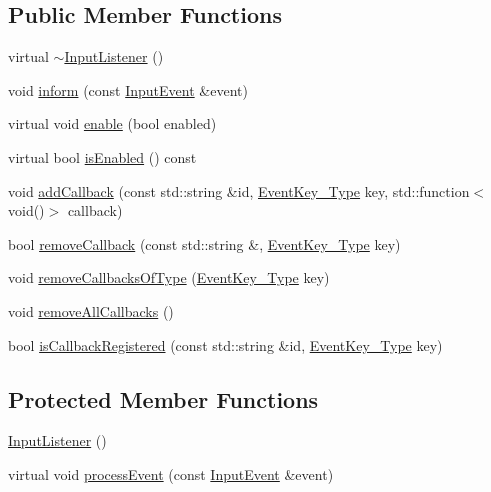 \subsection*{Public Member Functions}
\begin{DoxyCompactItemize}
\item 
virtual \mbox{\hyperlink{classec_1_1_input_listener_afd65ca201e735f5758646d6653f42804}{$\sim$\+Input\+Listener}} ()
\item 
void \mbox{\hyperlink{classec_1_1_input_listener_a39e0803651e945e177336df2cf84d61b}{inform}} (const \mbox{\hyperlink{structec_1_1_input_event}{Input\+Event}} \&event)
\item 
virtual void \mbox{\hyperlink{classec_1_1_input_listener_a459a44443e7de70e854c2175b6c6914d}{enable}} (bool enabled)
\item 
virtual bool \mbox{\hyperlink{classec_1_1_input_listener_a6d7a4e04543e3a86745261d9fefcbfc1}{is\+Enabled}} () const
\item 
void \mbox{\hyperlink{classec_1_1_input_listener_a9d43ca3fbda2db5809b29d7f237d41c4}{add\+Callback}} (const std\+::string \&id, \mbox{\hyperlink{classec_1_1_input_listener_af5dfb691564fa8e05fcf7f053e3c532b}{Event\+Key\+\_\+\+Type}} key, std\+::function$<$ void()$>$ callback)
\item 
bool \mbox{\hyperlink{classec_1_1_input_listener_a1f341d07bdf9c98392cd47c177c73de2}{remove\+Callback}} (const std\+::string \&, \mbox{\hyperlink{classec_1_1_input_listener_af5dfb691564fa8e05fcf7f053e3c532b}{Event\+Key\+\_\+\+Type}} key)
\item 
void \mbox{\hyperlink{classec_1_1_input_listener_a66e75fbfd13ec7cf87be9bebf2e02be8}{remove\+Callbacks\+Of\+Type}} (\mbox{\hyperlink{classec_1_1_input_listener_af5dfb691564fa8e05fcf7f053e3c532b}{Event\+Key\+\_\+\+Type}} key)
\item 
void \mbox{\hyperlink{classec_1_1_input_listener_ab3c4085477da60677e0a0659f750ead4}{remove\+All\+Callbacks}} ()
\item 
bool \mbox{\hyperlink{classec_1_1_input_listener_a7904bb2c23ef7dc00e341b8b3c9d1afb}{is\+Callback\+Registered}} (const std\+::string \&id, \mbox{\hyperlink{classec_1_1_input_listener_af5dfb691564fa8e05fcf7f053e3c532b}{Event\+Key\+\_\+\+Type}} key)
\end{DoxyCompactItemize}
\subsection*{Protected Member Functions}
\begin{DoxyCompactItemize}
\item 
\mbox{\hyperlink{classec_1_1_input_listener_aa44d25c2b2d3ef5e72611831fd66e10c}{Input\+Listener}} ()
\item 
virtual void \mbox{\hyperlink{classec_1_1_input_listener_a9ceaefc79c6b0b260e88454616137840}{process\+Event}} (const \mbox{\hyperlink{structec_1_1_input_event}{Input\+Event}} \&event)
\end{DoxyCompactItemize}

